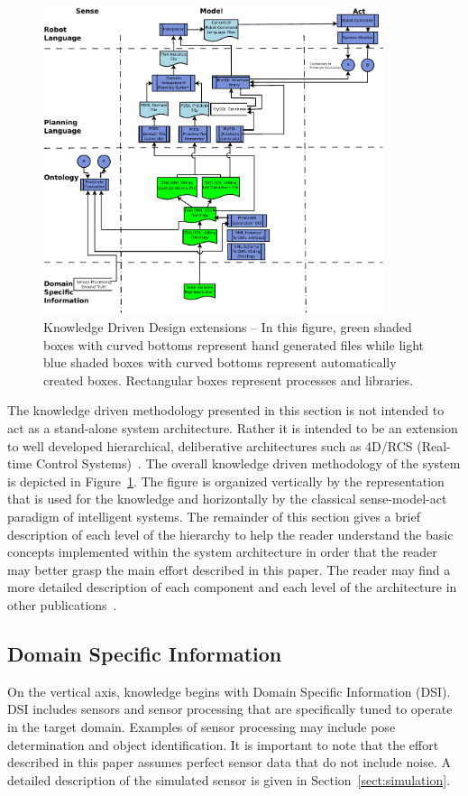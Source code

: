 \begin{figure}[!t!h!b!]
\centering
\includegraphics[width=10cm]{images/KnowledgeDrivenRobotics.pdf}
\caption{Knowledge Driven Design extensions -- In this figure, green shaded
  boxes with curved bottoms represent hand generated files while light blue
  shaded boxes with curved bottoms represent automatically created boxes.
  Rectangular boxes represent processes and libraries. }
\label{fig:methodology}
\end{figure}


The knowledge driven methodology presented in this section is not intended to act as a stand-alone system architecture. Rather it is intended to be an extension to well developed hierarchical, deliberative architectures such as 4D/RCS (Real-time Control Systems)~\cite{Albus2000}. The overall knowledge driven methodology of the system is depicted in Figure~\ref{fig:methodology}. The figure is organized vertically by the representation that is used for the knowledge and horizontally by the classical sense-model-act paradigm of intelligent systems. The remainder of this section gives a brief description of each level of the hierarchy to help the reader understand the basic concepts implemented within the system architecture in order that the reader may better grasp the main effort described in this paper. The reader may find a more detailed description of each component and each level of the architecture in other publications~\cite{BALAKIRSKY.IROS.2012}.

\subsection{Domain Specific Information}
\label{subsection:DSI}
On the vertical axis, knowledge begins with Domain Specific Information (DSI). DSI includes sensors and sensor processing that are specifically tuned to operate in the target domain. Examples of sensor processing may include pose determination and object identification. It is important to note that the effort described in this paper assumes perfect sensor data that do not include noise. A detailed description of the simulated sensor is given in Section~\ref{sect:simulation}.

